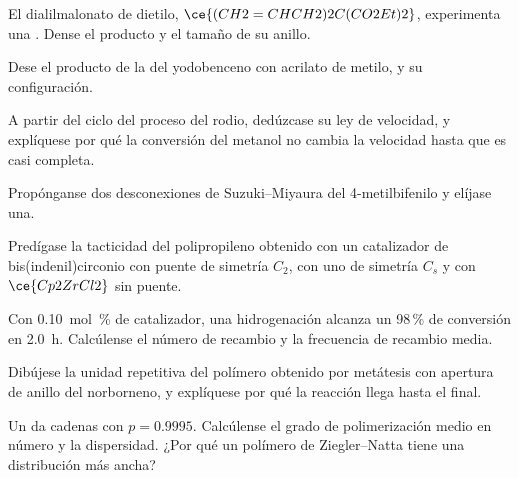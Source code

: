 \begin{exercise}[$\star$]\label{exo:b3:homogeneous-catalysis:3}
El dialilmalonato de dietilo, $\ce{(CH2=CHCH2)2C(CO2Et)2}$, experimenta una .
Dense el producto y el tamaño de su anillo.
\end{exercise}

\begin{exercise}[$\star$]\label{exo:b3:homogeneous-catalysis:4}
Dese el producto de la  del yodobenceno con acrilato de metilo, y su
configuración.
\end{exercise}

\begin{exercise}[$\star\star$]\label{exo:b3:homogeneous-catalysis:5}
A partir del ciclo del proceso del rodio, dedúzcase su ley de velocidad, y explíquese
por qué la conversión del metanol no cambia la velocidad hasta que es casi completa.
\end{exercise}

\begin{exercise}[$\star\star$]\label{exo:b3:homogeneous-catalysis:6}
Propónganse dos desconexiones de Suzuki--Miyaura del 4-metilbifenilo y elíjase una.
\end{exercise}

\begin{exercise}[$\star\star$]\label{exo:b3:homogeneous-catalysis:7}
Predígase la tacticidad del polipropileno obtenido con un catalizador de bis(indenil)circonio con puente
de simetría $C_2$, con uno de simetría $C_s$ y con $\ce{Cp2ZrCl2}$ sin puente.
\end{exercise}

\begin{exercise}[$\star\star$]\label{exo:b3:homogeneous-catalysis:8}
Con \qty{0.10}{mol\%} de catalizador, una hidrogenación alcanza un 98\,\% de conversión en \qty{2.0}{h}.
Calcúlense el número de recambio y la frecuencia de recambio media.
\end{exercise}

\begin{exercise}[$\star\star$]\label{exo:b3:homogeneous-catalysis:9}
Dibújese la unidad repetitiva del polímero obtenido por metátesis con apertura de anillo del
norborneno, y explíquese por qué la reacción llega hasta el final.
\end{exercise}

\begin{exercise}[$\star\star\star$]\label{exo:b3:homogeneous-catalysis:10}
Un  da cadenas con $p = 0.9995$. Calcúlense el grado de polimerización
medio en número y la dispersidad. ¿Por qué un polímero de Ziegler--Natta tiene una distribución
más ancha?
\end{exercise}

